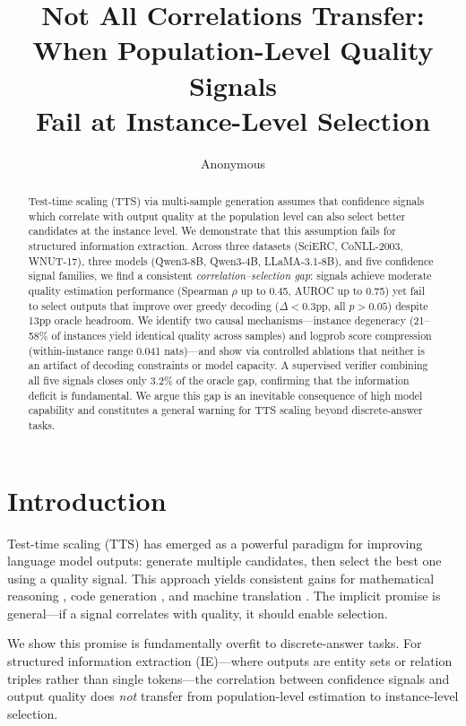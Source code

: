 \documentclass[11pt]{article}
\title{Not All Correlations Transfer: When Population-Level Quality Signals\\Fail at Instance-Level Selection}
\author{Anonymous}
\begin{document}
\maketitle

\begin{abstract}
Test-time scaling (TTS) via multi-sample generation assumes that confidence signals which correlate with output quality at the population level can also select better candidates at the instance level. We demonstrate that this assumption fails for structured information extraction. Across three datasets (SciERC, CoNLL-2003, WNUT-17), three models (Qwen3-8B, Qwen3-4B, LLaMA-3.1-8B), and five confidence signal families, we find a consistent \emph{correlation--selection gap}: signals achieve moderate quality estimation performance (Spearman $\rho$ up to 0.45, AUROC up to 0.75) yet fail to select outputs that improve over greedy decoding ($\Delta < 0.3$pp, all $p > 0.05$) despite 13pp oracle headroom. We identify two causal mechanisms---instance degeneracy (21--58\% of instances yield identical quality across samples) and logprob score compression (within-instance range 0.041 nats)---and show via controlled ablations that neither is an artifact of decoding constraints or model capacity. A supervised verifier combining all five signals closes only 3.2\% of the oracle gap, confirming that the information deficit is fundamental. We argue this gap is an inevitable consequence of high model capability and constitutes a general warning for TTS scaling beyond discrete-answer tasks.
\end{abstract}

\section{Introduction}

Test-time scaling (TTS) has emerged as a powerful paradigm for improving language model outputs: generate multiple candidates, then select the best one using a quality signal. This approach yields consistent gains for mathematical reasoning \cite{wang2023selfconsistency}, code generation \cite{chen2021codex}, and machine translation \cite{eikema2022sampling}. The implicit promise is general---if a signal correlates with quality, it should enable selection.

We show this promise is fundamentally overfit to discrete-answer tasks. For structured information extraction (IE)---where outputs are entity sets or relation triples rather than single tokens---the correlation between confidence signals and output quality does \emph{not} transfer from population-level estimation to instance-level selection.
\end{document}
